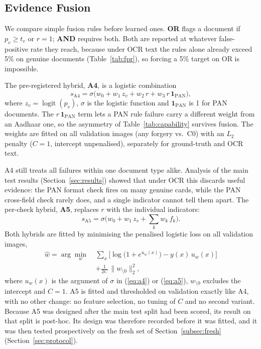 \documentclass[conference]{IEEEtran}
\begin{document}
\subsection{Evidence Fusion}
\label{sec:fusion}

We compare simple fusion rules before learned ones. \textbf{OR} flags a
document if $p_v \ge t_v$ or $r=1$; \textbf{AND} requires both. Both are
reported at whatever false-positive rate they reach, because under OCR
text the rules alone already exceed 5\% on genuine documents
(Table~\ref{tab:fpr}), so forcing a 5\% target on OR is impossible.

The pre-registered hybrid, \textbf{A4}, is a logistic combination
\begin{equation}
\label{eq:a4}
s_{\mathrm{A4}} = \sigma\big(w_0 + w_1\,z_v + w_2\,r + w_3\,r\,\mathbf{1}_{\mathrm{PAN}}\big),
\end{equation}
where $z_v=\operatorname{logit}(p_v)$, $\sigma$ is the logistic function
and $\mathbf{1}_{\mathrm{PAN}}$ is 1 for PAN documents. The
$r\,\mathbf{1}_{\mathrm{PAN}}$ term lets a PAN rule failure carry
a different weight from an Aadhaar one, so the asymmetry of
Table~\ref{tab:capability} survives fusion. The weights are fitted on
all validation images (any forgery vs.\ C0) with an $L_2$ penalty
($C=1$, intercept unpenalised), separately for ground-truth and OCR
text.

A4 still treats all failures within one document type alike. Analysis
of the main test results (Section~\ref{sec:results}) showed that under
OCR this discards useful evidence: the PAN format check fires on many
genuine cards, while the PAN cross-field check rarely does, and a single
indicator cannot tell them apart. The per-check hybrid, \textbf{A5},
replaces $r$ with the individual indicators:
\begin{equation}
\label{eq:a5}
s_{\mathrm{A5}} = \sigma\Big(w_0 + w_1\,z_v + \textstyle\sum_{k} w_{k}\,f_k\Big).
\end{equation}
Both hybrids are fitted by minimising the penalised logistic loss on
all validation images,
\begin{equation}
\label{eq:fit}
\begin{aligned}
\hat{w}=\arg\min_{w}\ &\sum_{x}\Big[\log\big(1+e^{u_w(x)}\big)-y(x)\,u_w(x)\Big]\\
&+\frac{1}{2C}\,\lVert w_{\setminus 0}\rVert_2^2,
\end{aligned}
\end{equation}
where $u_w(x)$ is the argument of $\sigma$ in (\ref{eq:a4}) or
(\ref{eq:a5}), $w_{\setminus 0}$ excludes the intercept and $C=1$.
A5 is fitted and thresholded on validation exactly like A4, with no
other change: no feature selection, no tuning of $C$ and no second
variant. Because A5 was designed after the main test split had been
scored, its result on that split is post-hoc. Its design was therefore
recorded before it was fitted, and it was then tested prospectively on
the fresh set of Section~\ref{subsec:fresh}
(Section~\ref{sec:protocol}).
\end{document}
